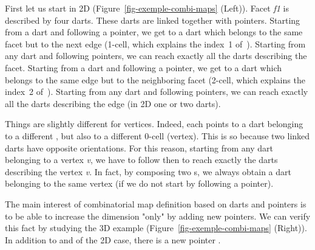 First let us start in 2D (Figure~\ref{fig-exemple-combi-maps} (Left)).
Facet \emph{f1} is described by four darts. These darts are linked
together with pointers. Starting from a dart and following a \betaun{} %
pointer, we get to a dart which belongs to the same facet but to the
next edge (1-cell, which explains the index~1 of~\betaun{}).
Starting from any dart and following \betaun{} pointers, we can reach
exactly all the darts describing the facet.  Starting from a dart and
following a \betadeux{} pointer, we get to a dart which belongs to the
same edge but to the neighboring facet (2-cell, which explains the
index~2 of~\betadeux{}).  Starting from any dart and following
\betadeux{} pointers, we can reach exactly all the darts describing the
edge (in 2D one or two darts).

Things are slightly different for vertices.  Indeed, each \betai{}
points to a dart belonging to a different , but also to a
different 0-cell (vertex).  This is so because two linked darts have
opposite orientations.  For this reason, starting from any dart
belonging to a vertex \emph{v}, we have to follow \betadeux{} then \betaun{}
to reach exactly the darts describing the vertex \emph{v}.  In fact, by
composing two \betai{}s, we always obtain a dart belonging to the
same vertex (if we do not start by following a \betaun{} pointer).

The main interest of combinatorial map definition based on darts and
\betai{} pointers is to be able to increase the dimension "only" by
adding new pointers. We can verify this fact by studying the 3D
example (Figure~\ref{fig-exemple-combi-maps} (Right)). In addition to
\betaun{} and \betadeux{} of the 2D case, there is a new pointer
\betatrois{}.


